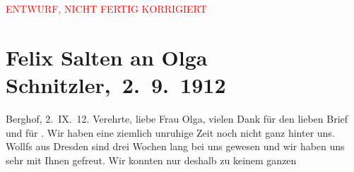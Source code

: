 
\begin{center}
            \textcolor{red}{ENTWURF, NICHT FERTIG KORRIGIERT}
                      \end{center}
            
         
         \renewcommand{\erwaehntePersonen}{Personen:  ?? [Haushaltshilfe der Familie Salten 1912], Samuel Fischer, Hedwig Fischer, Richard Kralik, Ottilie Salten, Olga Schnitzler, Emil Schwarz, Elisabeth Steinrück, Julius Ferdinand Wollf, Johanna Sophie Wollf}
         \renewcommand{\erwaehnteInstitutionen}{Institutionen: Burgtheater}
         \renewcommand{\erwaehnteOrte}{Orte: Berghof, Cottagegasse, Dresden, München, Sanatorium Hera, Unterach am Attersee, Wien}
         \renewcommand{\erwaehnteWerke}{}
               \section[ Felix Salten an Olga Schnitzler, 2. 9. 1912]{ Felix Salten an Olga Schnitzler, 2. 9. 1912}\nopagebreak{}\rehead{ }\begin{ledgroupsized}[t]{13cm}\normalsize\beginnumbering \toendnotes[C]{\smallbreak\pagebreak[2]} 
\toendnotes[C]{\smallbreak}\pstart
           \raggedleft{}{\pb}Berghof, 2. IX. 12.\pend
           \pstart{}Verehrte, liebe Frau Olga,\pend\pstart
           vielen Dank für den lieben Brief und für \label{K_L03560-1v}\label{K_L03560-1h}. Wir haben eine ziemlich unruhige Zeit
               noch nicht ganz hinter uns. Wollfs
               aus Dresden sind drei Wochen lang bei uns gewesen
               und wir haben uns sehr mit Ihnen gefreut. Wir konnten nur deshalb zu keinem ganzen

\end{ledgroupsized}
